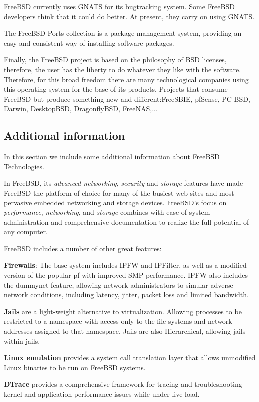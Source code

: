 \documentclass[11pt]{article}
\begin{document}
FreeBSD currently uses GNATS for its bugtracking system. Some FreeBSD developers think that it could do better. At present, they carry on using GNATS.

The FreeBSD Ports collection is a package management system, providing an easy and consistent way of installing software packages. 

Finally, the FreeBSD project is based on the philosophy of BSD licenses, therefore, the user has the liberty to do whatever they like with the software. Therefore, for this broad freedom there are many technological companies using this operating system for the base of its products. Projects that consume FreeBSD but produce something new and different:FreeSBIE, pfSense, PC-BSD, Darwin, DesktopBSD, DragonflyBSD, FreeNAS,...

\subsection{Additional information}
In this section we include some additional information about FreeBSD Technologies.

In FreeBSD, its \emph{advanced networking}, \emph{security} and \emph{storage} features have made FreeBSD the platform of choice for many of the busiest web sites and most pervasive embedded networking and storage devices. FreeBSD's focus on \emph{performance}, \emph{networking}, and \emph{storage} combines with ease of system administration and comprehensive documentation to realize the full potential of any computer.

FreeBSD includes a number of other great features:

    \textbf{Firewalls}: The base system includes IPFW and IPFilter, as well as a modified version of the popular pf with improved SMP performance. IPFW also includes the dummynet feature, allowing network administrators to simular adverse network conditions, including latency, jitter, packet loss and limited bandwidth.
    
    \textbf{Jails} are a light-weight alternative to virtualization. Allowing processes to be restricted to a namespace with access only to the file systems and network addresses assigned to that namespace. Jails are also Hierarchical, allowing jails-within-jails.  
    
    \textbf{Linux emulation }provides a system call translation layer that allows unmodified Linux binaries to be run on FreeBSD systems. 
    
    \textbf{DTrace} provides a comprehensive framework for tracing and troubleshooting kernel and application performance issues while under live load.
    
\end{document}

